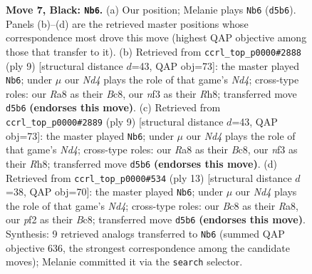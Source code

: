 \documentclass[11pt]{article}
\begin{document}
\begin{figure}[p]
\caption{\textbf{Move 7, Black: \texttt{Nb6}.} (a) Our position; Melanie plays \texttt{Nb6} (\texttt{d5b6}). Panels (b)--(d) are the retrieved master positions whose correspondence most drove this move (highest QAP objective among those that transfer to it). (b) Retrieved from \texttt{ccrl\_top\_p0000\#2888} (ply 9) [structural distance $d$=43, QAP obj=73]: the master played \texttt{Nb6}; under $\mu$ our \emph{Nd4} plays the role of that game's \emph{Nd4}; cross-type roles: our \emph{R}a8 as their \emph{B}c8, our \emph{n}f3 as their \emph{R}h8; transferred move \texttt{d5b6} \textbf{(endorses this move)}. (c) Retrieved from \texttt{ccrl\_top\_p0000\#2889} (ply 9) [structural distance $d$=43, QAP obj=73]: the master played \texttt{Nb6}; under $\mu$ our \emph{Nd4} plays the role of that game's \emph{Nd4}; cross-type roles: our \emph{R}a8 as their \emph{B}c8, our \emph{n}f3 as their \emph{R}h8; transferred move \texttt{d5b6} \textbf{(endorses this move)}. (d) Retrieved from \texttt{ccrl\_top\_p0000\#534} (ply 13) [structural distance $d$=38, QAP obj=70]: the master played \texttt{Nb6}; under $\mu$ our \emph{Nd4} plays the role of that game's \emph{Nd4}; cross-type roles: our \emph{B}c8 as their \emph{R}a8, our \emph{p}f2 as their \emph{B}c8; transferred move \texttt{d5b6} \textbf{(endorses this move)}. Synthesis: 9 retrieved analogs transferred to \texttt{Nb6} (summed QAP objective 636, the strongest correspondence among the candidate moves); Melanie committed it via the \texttt{search} selector.}
\label{fig:thought-m13}
\end{figure}

\clearpage
\end{document}
